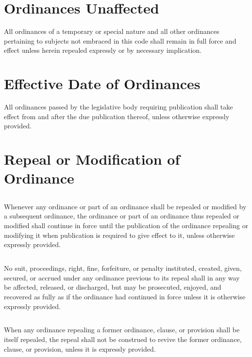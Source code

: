 \section{Ordinances Unaffected}
All ordinances of a temporary or special nature and all other ordinances pertaining to subjects not embraced in this code shall remain in full force and effect unless herein repealed expressly or by necessary implication.



\section{Effective Date of Ordinances}
All ordinances passed by the legislative body requiring publication shall take effect from and after the due publication thereof, unless otherwise expressly provided.



\section{Repeal or Modification of Ordinance}
\subsection{}
Whenever any ordinance or part of an ordinance shall be repealed or modified by a subsequent ordinance, the ordinance or part of an ordinance thus repealed or modified shall continue in force until the publication of the ordinance repealing or modifying it when publication is required to give effect to it, unless otherwise expressly provided.
\subsection{}
No suit, proceedings, right, fine, forfeiture, or penalty instituted, created, given, secured, or accrued under any ordinance previous to its repeal shall in any way be affected, released, or discharged, but may be prosecuted, enjoyed, and recovered as fully as if the ordinance had continued in force unless it is otherwise expressly provided.
\subsection{}
When any ordinance repealing a former ordinance, clause, or provision shall be itself repealed, the repeal shall not be construed to revive the former ordinance, clause, or provision, unless it is expressly provided.



